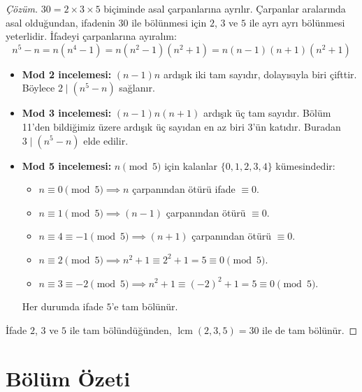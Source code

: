 \begin{proof}[Çözüm]
$30 = 2 \times 3 \times 5$ biçiminde asal çarpanlarına ayrılır. Çarpanlar aralarında asal olduğundan, ifadenin $30$ ile bölünmesi için $2$, $3$ ve $5$ ile ayrı ayrı bölünmesi yeterlidir.
İfadeyi çarpanlarına ayıralım:
\[
n^5 - n = n(n^4 - 1) = n(n^2 - 1)(n^2 + 1) = n(n - 1)(n + 1)(n^2 + 1)
\]
\begin{itemize}
    \item \textbf{Mod 2 incelemesi:} $(n - 1)n$ ardışık iki tam sayıdır, dolayısıyla biri çifttir. Böylece $2 \mid (n^5 - n)$ sağlanır.
    \item \textbf{Mod 3 incelemesi:} $(n - 1)n(n + 1)$ ardışık üç tam sayıdır. Bölüm 11'den bildiğimiz üzere ardışık üç sayıdan en az biri $3$'ün katıdır. Buradan $3 \mid (n^5 - n)$ elde edilir.
    \item \textbf{Mod 5 incelemesi:} $n \pmod 5$ için kalanlar $\{0, 1, 2, 3, 4\}$ kümesindedir:
    \begin{itemize}
        \item $n \equiv 0 \pmod 5 \implies n$ çarpanından ötürü ifade $\equiv 0$.
        \item $n \equiv 1 \pmod 5 \implies (n - 1)$ çarpanından ötürü $\equiv 0$.
        \item $n \equiv 4 \equiv -1 \pmod 5 \implies (n + 1)$ çarpanından ötürü $\equiv 0$.
        \item $n \equiv 2 \pmod 5 \implies n^2 + 1 \equiv 2^2 + 1 = 5 \equiv 0 \pmod 5$.
        \item $n \equiv 3 \equiv -2 \pmod 5 \implies n^2 + 1 \equiv (-2)^2 + 1 = 5 \equiv 0 \pmod 5$.
    \end{itemize}
    Her durumda ifade $5$'e tam bölünür.
\end{itemize}
İfade $2$, $3$ ve $5$ ile tam bölündüğünden, $\operatorname{lcm}(2, 3, 5) = 30$ ile de tam bölünür.
\end{proof}

\section*{Bölüm Özeti}

